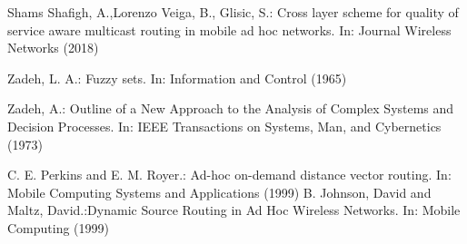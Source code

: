 \documentclass[runningheads]{llncs}
\begin{document}
\begin{thebibliography}{5}
Shams Shafigh, A.,Lorenzo Veiga, B., Glisic, S.: Cross layer scheme for quality of service aware multicast routing in mobile ad hoc networks. In: Journal
Wireless Networks (2018)

Zadeh, L. A.: Fuzzy sets. In: Information and Control (1965)

Zadeh, A.: Outline of a New Approach to the Analysis of Complex Systems and Decision Processes. In: IEEE Transactions on Systems, Man, and Cybernetics (1973)

C. E. Perkins and E. M. Royer.: Ad-hoc on-demand distance vector routing. In: Mobile Computing Systems and Applications (1999)
B. Johnson, David and Maltz, David.:Dynamic Source Routing in Ad Hoc Wireless Networks. In: Mobile Computing (1999)



%
%

\end{thebibliography}
\end{document}
